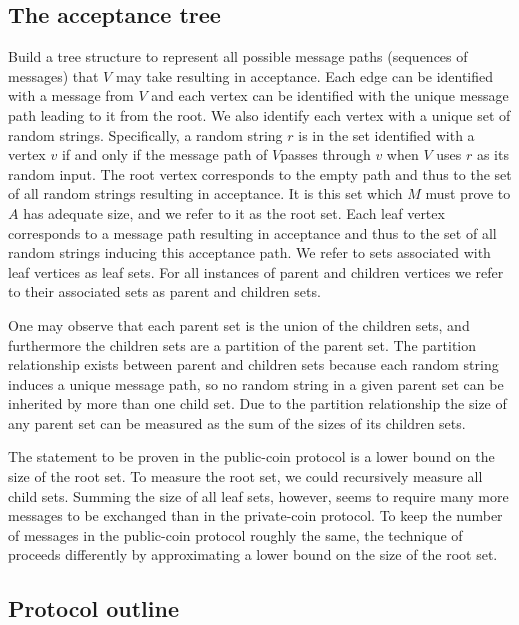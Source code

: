 \subsection{The acceptance tree}

Build a tree structure to represent all possible message paths (sequences of messages) that $V$ may take resulting in acceptance.
Each edge can be identified with a message from $V$ and each vertex can be identified with the unique message path leading to it from the root.
We also identify each vertex with a unique set of random strings.
Specifically, a random string $r$ is in the set identified with a vertex $v$ if and only if the message path of $V$passes through $v$ when $V$ uses $r$ as its random input.
The root vertex corresponds to the empty path and thus to the set of all random strings resulting in acceptance.
It is this set which $M$ must prove to $A$ has adequate size, and we refer to it as the root set.
Each leaf vertex corresponds to a message path resulting in acceptance and thus to the set of all random strings inducing this acceptance path.
We refer to sets associated with leaf vertices as leaf sets.
For all instances of parent and children vertices we refer to their associated sets as parent and children sets.

One may observe that each parent set is the union of the children sets, and furthermore the children sets are a partition of the parent set.
The partition relationship exists between parent and children sets because each random string induces a unique message path, so no random string in a given parent set can be inherited by more than one child set.
Due to the partition relationship the size of any parent set can be measured as the sum of the sizes of its children sets.

The statement to be proven in the public-coin protocol is a lower bound on the size of the root set.
To measure the root set, we could recursively measure all child sets.
Summing the size of all leaf sets, however, seems to require many more messages to be exchanged than in the private-coin protocol.
To keep the number of messages in the public-coin protocol roughly the same, the technique of \cite{GS86} proceeds differently by approximating a lower bound on the size of the root set.

\subsection{Protocol outline}

